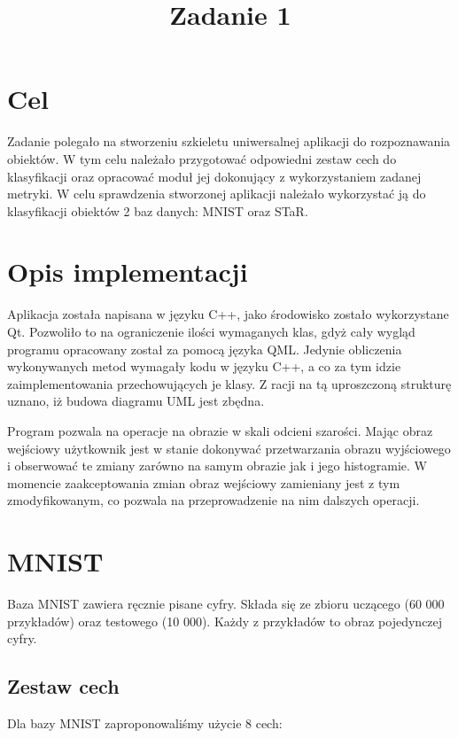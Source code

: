 \documentclass{classrep}
\author{
  \studentinfo{Hubert Marcinkowski}{214942} \and
  \studentinfo{Artur Wróblewski}{214985}
}
\title{Zadanie 1}
\begin{document}
\maketitle


\section{Cel}
Zadanie polegało na stworzeniu szkieletu uniwersalnej aplikacji do rozpoznawania obiektów. W tym celu należało przygotować odpowiedni zestaw cech do klasyfikacji oraz opracować moduł jej dokonujący z wykorzystaniem zadanej metryki. W celu sprawdzenia stworzonej aplikacji należało wykorzystać ją do klasyfikacji obiektów 2 baz danych: MNIST oraz STaR.

\section{Opis implementacji}

Aplikacja została napisana w języku C++, jako środowisko zostało wykorzystane Qt. Pozwoliło to na ograniczenie ilości wymaganych klas, gdyż cały wygląd programu opracowany został za pomocą języka QML. Jedynie obliczenia wykonywanych metod wymagały kodu w języku C++, a co za tym idzie zaimplementowania przechowujących je klasy. Z racji na tą uproszczoną strukturę uznano, iż budowa diagramu UML jest zbędna.

Program pozwala na operacje na obrazie w skali odcieni szarości. Mając obraz wejściowy użytkownik jest w stanie dokonywać przetwarzania obrazu wyjściowego i obserwować te zmiany zarówno na samym obrazie jak i jego histogramie. W momencie zaakceptowania zmian obraz wejściowy zamieniany jest z tym zmodyfikowanym, co pozwala na przeprowadzenie na nim dalszych operacji.

\section{MNIST}

Baza MNIST zawiera ręcznie pisane cyfry. Składa się ze zbioru uczącego (60 000 przykładów) oraz testowego (10 000). Każdy z przykładów to obraz pojedynczej cyfry.

\subsection{Zestaw cech}

Dla bazy MNIST zaproponowaliśmy użycie 8 cech:
\end{document}

